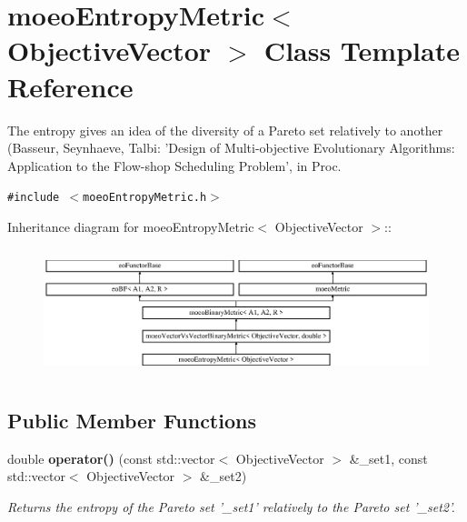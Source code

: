 \section{moeo\-Entropy\-Metric$<$ Objective\-Vector $>$ Class Template Reference}
\label{classmoeoEntropyMetric}
The entropy gives an idea of the diversity of a Pareto set relatively to another (Basseur, Seynhaeve, Talbi: 'Design of Multi-objective Evolutionary Algorithms: Application to the Flow-shop Scheduling Problem', in Proc.  


{\tt \#include $<$moeo\-Entropy\-Metric.h$>$}

Inheritance diagram for moeo\-Entropy\-Metric$<$ Objective\-Vector $>$::\begin{figure}[H]
\begin{center}
\leavevmode
\includegraphics[height=3.71353cm]{classmoeoEntropyMetric}
\end{center}
\end{figure}
\subsection*{Public Member Functions}
\begin{CompactItemize}
\item 
double {\bf operator()} (const std::vector$<$ Objective\-Vector $>$ \&\_\-set1, const std::vector$<$ Objective\-Vector $>$ \&\_\-set2)
\begin{CompactList}\small\item\em Returns the entropy of the Pareto set '\_\-set1' relatively to the Pareto set '\_\-set2'. \item\end{CompactList}\end{CompactItemize}
